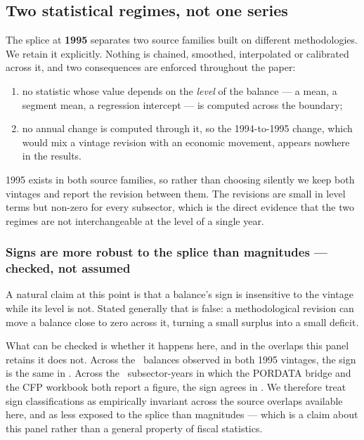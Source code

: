 \subsection{Two statistical regimes, not one series}

The splice at \textbf{1995} separates two source families built on different
methodologies. We retain it explicitly. Nothing is chained, smoothed, interpolated
or calibrated across it, and two consequences are enforced throughout the paper:

\begin{enumerate}
\item no statistic whose value depends on the \emph{level} of the balance --- a
mean, a segment mean, a regression intercept --- is computed across the boundary;
\item no annual change is computed through it, so the 1994-to-1995 change, which
would mix a vintage revision with an economic movement, appears nowhere in the
results.
\end{enumerate}

1995 exists in both source families, so rather than choosing silently we keep both
vintages and report the revision between them. The revisions are small in level
terms but non-zero for every subsector, which is the direct evidence that the two
regimes are not interchangeable at the level of a single year.

\subsubsection*{Signs are more robust to the splice than magnitudes --- checked, not assumed}

A natural claim at this point is that a balance's sign is insensitive to the vintage
while its level is not. Stated generally that is false: a methodological revision can
move a balance close to zero across it, turning a small surplus into a small deficit.

What can be checked is whether it happens here, and in the overlaps this panel
retains it does not. Across the \OverlapSignTotal\ balances observed in both 1995
vintages, the sign is the same in \OverlapSignAgreements. Across the
\SourceSignComparisons\ subsector-years in which the PORDATA bridge and the CFP
workbook both report a figure, the sign agrees in \SourceSignAgreements. We therefore
treat sign classifications as empirically invariant across the source overlaps
available here, and as less exposed to the splice than magnitudes --- which is a claim
about this panel rather than a general property of fiscal statistics.

